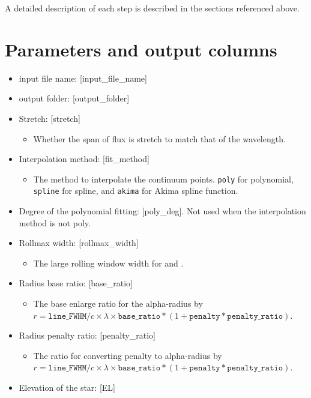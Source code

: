 \documentclass{article}
\begin{document}
A detailed description of each step is described in the sections referenced above.

\section{Parameters and output columns}

\begin{itemize}
    \item input file name: [input_file_name]
    \item output folder: [output_folder]
    \item Stretch: [stretch]
    \begin{itemize}
        \item Whether the span of flux is stretch to match that of the wavelength. 
    \end{itemize}
    \item Interpolation method: [fit_method]
    \begin{itemize}
        \item The method to interpolate the continuum points. \texttt{poly} for polynomial, \texttt{spline} for spline, and \texttt{akima} for Akima spline function. 
    \end{itemize}
    \item Degree of the polynomial fitting: [poly_deg]. Not used when the interpolation method is not poly.
    \item Rollmax width: [rollmax_width]
    \begin{itemize}
        \item The large rolling window width for  and . 
    \end{itemize}
    \item Radius base ratio: [base_ratio]
    \begin{itemize}
        \item The base enlarge ratio for the alpha-radius by $r = \texttt{line\_FWHM} / c \times \lambda \times \texttt{base\_ratio} * (1 + \texttt{penalty} * \texttt{penalty\_ratio})$. 
    \end{itemize}
    \item Radius penalty ratio: [penalty_ratio]
    \begin{itemize}
        \item The ratio for converting penalty to alpha-radius by $r = \texttt{line\_FWHM} / c \times \lambda \times \texttt{base\_ratio} * (1 + \texttt{penalty} * \texttt{penalty\_ratio})$. 
    \end{itemize}
    \item Elevation of the star: [EL]
\end{itemize}
\end{document}
